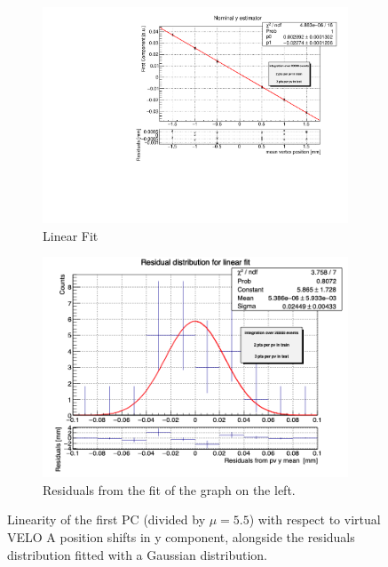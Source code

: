 \begin{samepage}
\begin{figure}
    \label{fig:x_veloA_MC}
\end{figure}
\begin{figure}
    \centering
    \begin{subfigure}{0.48\textwidth}
    \includegraphics[width=\linewidth]{figures/y_fit_veloA_MC_normalised.pdf}
    \caption{Linear Fit}\label{fig:y_veloA_fit_MC}
    \end{subfigure}
    \begin{subfigure}{0.48\textwidth}
    \includegraphics[width=\linewidth]{figures/y_res_veloA_MC.png}
    \caption{Residuals from the fit of the graph on the left. }\label{fig:y_veloA_res_MC}
    \end{subfigure}
    \caption{Linearity of the first PC (divided by $\mu=5.5$) with respect to virtual VELO A position shifts in y component, alongside the residuals distribution fitted with a Gaussian distribution.}

\end{figure}
\end{samepage}

